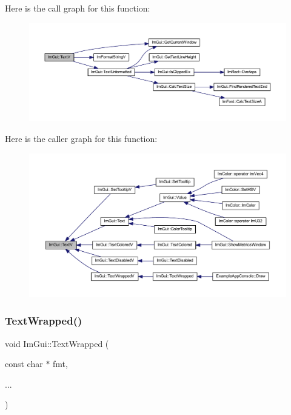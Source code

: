 Here is the call graph for this function\+:
\nopagebreak
\begin{figure}[H]
\begin{center}
\leavevmode
\includegraphics[width=350pt]{namespace_im_gui_a10a0d6362178c2f743092f21e1b6cd20_cgraph}
\end{center}
\end{figure}
Here is the caller graph for this function\+:
\nopagebreak
\begin{figure}[H]
\begin{center}
\leavevmode
\includegraphics[width=350pt]{namespace_im_gui_a10a0d6362178c2f743092f21e1b6cd20_icgraph}
\end{center}
\end{figure}
\mbox{\label{namespace_im_gui_ad57bb15c599e73b2ccc7c0f7de6e5823}} 
\subsubsection{\texorpdfstring{Text\+Wrapped()}{TextWrapped()}}
{\footnotesize\ttfamily void Im\+Gui\+::\+Text\+Wrapped (\begin{DoxyParamCaption}\item[{const char $\ast$}]{fmt,  }\item[{}]{... }\end{DoxyParamCaption})}

